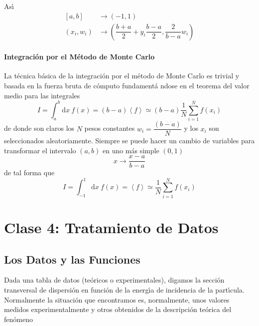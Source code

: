 \documentclass[spanish,titlepage,11pt]{article}
\begin{document}
As\'{\i}
\begin{align}
\left[  a,b\right]   &  \longrightarrow\left(  -1,1\right) \\
\left(  x_{i},w_{i}\right)   &  \longrightarrow\left(  \dfrac{b+a}{2}%
+y_{i}\dfrac{b-a}{2},\dfrac{2}{b-a}w_{i}\right)
\end{align}

\paragraph{Integraci\'{o}n por el M\'{e}todo de Monte Carlo}

La t\'{e}cnica b\'{a}sica de la integraci\'{o}n por el m\'{e}todo de Monte
Carlo es trivial y basada en la fuerza bruta de c\'{o}mputo fundament\'{a}%
ndose en el teorema del valor medio para las integrales
\begin{equation}
I=\int_{a}^{b}\mathrm{d}x\ f(x)=\left(  b-a\right)  \left\langle
f\right\rangle \simeq\left(  b-a\right)  \dfrac{1}{N}\sum_{i=1}^{N}f(x_{i})
\end{equation}
de donde son claros los $N$ pesos constantes $w_{i}=\dfrac{\left(  b-a\right)
}{N}$ y los $x_{i}$ son seleccionados aleatoriamente. Siempre se puede hacer
un cambio de variables para transformar el intervalo $\left(  a,b\right)  $ en
uno m\'{a}s simple $\left(  0,1\right)  $%
\begin{equation}
x\longrightarrow\dfrac{x-a}{b-a}%
\end{equation}
de tal forma que
\begin{equation}
I=\int_{-1}^{1}\mathrm{d}x\ f(x)=\left\langle f\right\rangle \simeq\dfrac
{1}{N}\sum_{i=1}^{N}f(x_{i})
\end{equation}

\newpage\newpage

\section{\textbf{Clase 4: Tratamiento de Datos}}

\subsection{Los Datos y las Funciones}

Dada una tabla de datos (te\'{o}ricos o experimentales), digamos la
secci\'{o}n transversal de dispersi\'{o}n en funci\'{o}n de la energ\'{\i}a de
incidencia de la part\'{\i}cula. Normalmente la situaci\'{o}n que encontramos
es, normalmente, unos valores medidos experimentalmente y otros obtenidos de
la descripci\'{o}n te\'{o}rica del fen\'{o}meno
\end{document}
